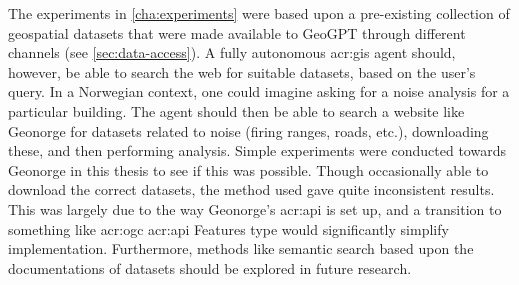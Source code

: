 The experiments in \autoref{cha:experiments} were based upon a pre-existing collection of geospatial datasets that were made available to GeoGPT through different channels (see \autoref{sec:data-access}). A fully autonomous \acrshort{acr:gis} agent should, however, be able to search the web for suitable datasets, based on the user's query. In a Norwegian context, one could imagine asking for a noise analysis for a particular building. The agent should then be able to search a website like Geonorge for datasets related to noise (firing ranges, roads, etc.), downloading these, and then performing analysis. Simple experiments were conducted towards Geonorge in this thesis to see if this was possible. Though occasionally able to download the correct datasets, the method used gave quite inconsistent results.  This was largely due to the way Geonorge's \acrshort{acr:api} is set up, and a transition to something like \acrshort{acr:ogc} \acrshort{acr:api} Features type  would significantly simplify implementation. Furthermore, methods like semantic search based upon the documentations of datasets should be explored in future research.